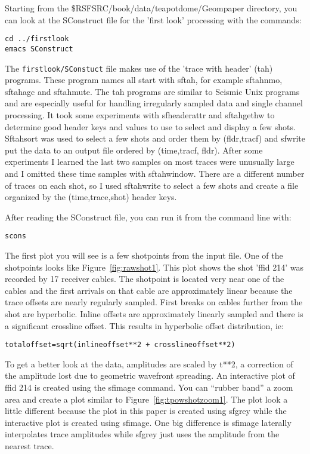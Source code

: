 Starting from the \$RSFSRC/book/data/teapotdome/Geompaper directory, you can look at the SConstruct file for the 'first look' processing with the commands:
\begin{verbatim}
cd ../firstlook
emacs SConstruct
\end{verbatim}

The \texttt{firstlook/SConstuct} file makes use of the 'trace with header' (tah) programs.  These program names all start with sftah, for example sftahnmo, sftahagc and sftahmute.  The tah programs are similar to Seismic Unix programs and are especially useful for handling irregularly sampled data and single channel processing.   It took some experiments with sfheaderattr and sftahgethw to determine good header keys and values to use to select and display a few shots.  Sftahsort was used to select a few shots and order them by (fldr,tracf) and sfwrite put the data to an output file ordered by (time,tracf, fldr).  After some experiments I learned the last two samples on most traces were unusually large and I omitted these time samples with sftahwindow.   There are a different number of traces on each shot, so I used sftahwrite to select a few shots and create a file organized by the (time,trace,shot) header keys. 

After reading the SConstruct file, you can run it from the command line with:
\begin{verbatim}   
scons
\end{verbatim}   

The first plot you will see is a few shotpoints from the input file.  One of the shotpoints looks like Figure~\ref{fig:rawshot1}.  This plot shows the shot 'ffid 214' was recorded by 17 receiver cables.  The shotpoint is located very near one of the cables and the first arrivals on that cable are approximately linear because the trace offsets are nearly regularly sampled.  First breaks on cables further from the shot are hyperbolic.   Inline offsets are approximately linearly sampled and there is a significant crossline offset.  This results in hyperbolic offset distribution, ie:
\begin{verbatim}   
totaloffset=sqrt(inlineoffset**2 + crosslineoffset**2) 
\end{verbatim}   

To get a better look at the data, amplitudes are scaled by t**2, a correction of the amplitude lost due to geometric wavefront spreading.  An interactive plot of ffid 214 is created using the sfimage command.  You can “rubber band” a zoom area and create a plot similar to Figure~\ref{fig:tpowshotzoom1}.   The plot look a little different because the plot in this paper is created using sfgrey while the interactive plot is created using sfimage.  One big difference is sfimage laterally interpolates trace amplitudes while sfgrey just uses the amplitude from the nearest trace.

